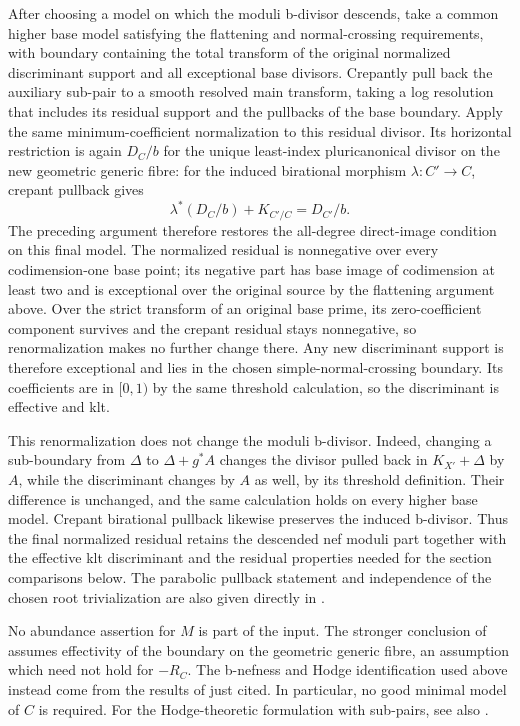 After choosing a model on which the moduli b-divisor descends, take
a common higher base model satisfying the flattening and
normal-crossing requirements, with boundary containing the total
transform of the original normalized discriminant support and all
exceptional base divisors. Crepantly pull back the auxiliary sub-pair
to a smooth resolved main transform, taking a log resolution that
includes its residual support and the pullbacks of the base boundary.
Apply the same minimum-coefficient normalization to this residual divisor. Its
horizontal restriction is again \(D_C/b\) for the unique
least-index pluricanonical divisor on the new geometric generic
fibre: for the induced birational morphism \(\lambda:C'\to C\),
crepant pullback gives
\[
 \lambda^*(D_C/b)+K_{C'/C}=D_{C'}/b.
\]
The preceding argument therefore restores the all-degree
direct-image condition on this final model. The normalized residual
is nonnegative over every codimension-one base point; its negative
part has base image of codimension at least two and is exceptional
over the original source by the flattening argument above. Over the
strict transform of an original base prime, its zero-coefficient
component survives and the crepant residual stays nonnegative, so
renormalization makes no further change there. Any new discriminant
support is therefore exceptional and lies in the chosen
simple-normal-crossing boundary. Its coefficients are in \([0,1)\)
by the same threshold calculation, so the discriminant is effective
and klt.

This renormalization does not change the moduli b-divisor. Indeed,
changing a sub-boundary from \(\Delta\) to \(\Delta+g^*A\) changes
the divisor pulled back in \(K_{X'}+\Delta\) by \(A\), while the
discriminant changes by \(A\) as well, by its threshold definition.
Their difference is unchanged, and the same calculation holds on
every higher base model. Crepant birational pullback likewise
preserves the induced b-divisor. Thus the final normalized residual
retains the descended nef moduli part together with the effective
klt discriminant and the residual properties needed for the section
comparisons below.
The parabolic pullback statement and independence of the chosen root
trivialization are also given directly in
\cite[Definition-Proposition~7.1]{AmbroBoundary}.

\begin{remark}
\label{altord:cb:no-abundance}
No abundance assertion for \(M\) is part of the input.
The stronger conclusion of
\cite[Theorem~3.3]{AmbroModuli} assumes effectivity of the boundary on
the geometric generic fibre, an assumption which need not hold for
\(-R_C\).  The b-nefness and Hodge identification used above instead
come from the results of \cite{AmbroBoundary} just cited.
In particular, no good minimal model of \(C\) is required.
For the Hodge-theoretic formulation with sub-pairs, see also
\cite[Definition~6.18, Construction-Definition~6.23,
Remark~6.25, and Theorem~6.28]{BFMT}.
\end{remark}

